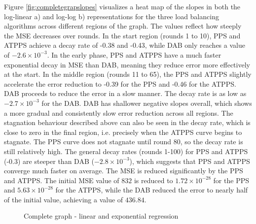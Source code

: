 Figure \ref{fig:completegrapslopes} visualizes a heat map of the slopes in both the log-linear a) and log-log b) representations for the three load balancing algorithms across different regions of the graph. The values reflect how steeply the MSE decreases over rounds. In the start region (rounds 1 to 10), PPS and ATPPS achieve a decay rate of -0.38 and -0.43, while DAB only reaches a value of $-2.6 \times 10^{-3}$. In the early phase, PPS and ATPPS have a much faster exponential decay in MSE than DAB, meaning they reduce error more effectively at the start. In the middle region (rounds 11 to 65), the PPS and ATPPS slightly accelerate the error reduction to -0.39 for the PPS and -0.46 for the ATPPS. DAB proceeds to reduce the error in a slow manner. The decay rate is as low as $-2.7 \times 10^{-3}$ for the DAB. DAB has shallower negative slopes overall, which shows a more gradual and consistently slow error reduction across all regions. The stagnation behaviour described above can also be seen in the decay rate, which is close to zero in the final region, i.e. precisely when the ATPPS curve begins to stagnate. The PPS curve does not stagnate until round 80, so the decay rate is still relatively high. The general decay rates (rounds 1-100) for PPS and ATPPS (-0.3) are steeper than DAB ($-2.8 \times 10^{-3}$), which suggests that PPS and ATPPS converge much faster on average. The MSE is reduced significantly by the PPS and ATPPS. The initial MSE value of $832$ is reduced to $1.72 \times 10^{-28}$ for the PPS and $5.63 \times 10^{-28}$ for the ATPPS, while the DAB reduced the error to nearly half of the initial value, achieving a value of $436.84$.

\begin{figure}[!ht]
    \centering
    \hfil
    \caption{Complete graph - linear and exponential regression}
        \label{fig:dabCompleteModelFit}
\end{figure}

